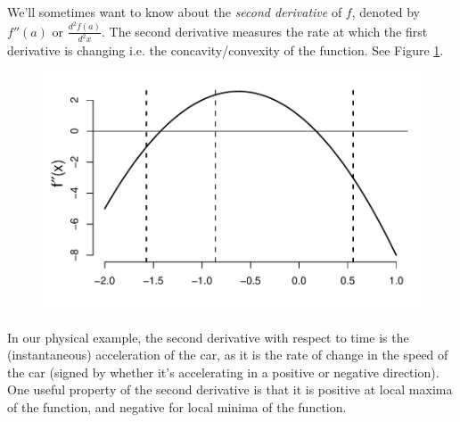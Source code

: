 We'll sometimes want to know about the  \emph{second derivative} of
$f$, denoted by $f''(a)$ or $\frac{d^2f(a)}{d^2x}$. 
The second
derivative measures the rate at which the first derivative is changing
i.e. the concavity/convexity of the function. See Figure \ref{Fig:2nd_derivative}.
 \begin{figure}
 \begin{center}
   \includegraphics[width=0.7 \textwidth]{math_background/calc_pics/2nd_Derivat.pdf}\end{center}
 \caption{ }\label{Fig:2nd_derivative}
 \end{figure}
In our physical example, the second derivative with respect to time is
the (instantaneous) acceleration of the car, as it is the rate of
change in the speed of the car (signed by
whether it's accelerating in a positive or negative direction). One
useful property of the second derivative is that it is positive at
local maxima of the function, and negative for local minima of the function.



